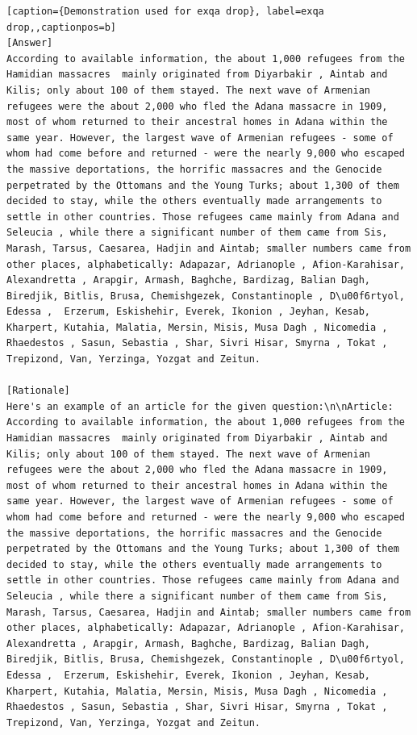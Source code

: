 \begin{lstlisting}[caption={Demonstration used for exqa drop}, label=exqa drop,,captionpos=b]
[Answer]
According to available information, the about 1,000 refugees from the Hamidian massacres  mainly originated from Diyarbakir , Aintab and Kilis; only about 100 of them stayed. The next wave of Armenian refugees were the about 2,000 who fled the Adana massacre in 1909, most of whom returned to their ancestral homes in Adana within the same year. However, the largest wave of Armenian refugees - some of whom had come before and returned - were the nearly 9,000 who escaped the massive deportations, the horrific massacres and the Genocide perpetrated by the Ottomans and the Young Turks; about 1,300 of them decided to stay, while the others eventually made arrangements to settle in other countries. Those refugees came mainly from Adana and Seleucia , while there a significant number of them came from Sis, Marash, Tarsus, Caesarea, Hadjin and Aintab; smaller numbers came from other places, alphabetically: Adapazar, Adrianople , Afion-Karahisar, Alexandretta , Arapgir, Armash, Baghche, Bardizag, Balian Dagh, Biredjik, Bitlis, Brusa, Chemishgezek, Constantinople , D\u00f6rtyol, Edessa ,  Erzerum, Eskishehir, Everek, Ikonion , Jeyhan, Kesab, Kharpert, Kutahia, Malatia, Mersin, Misis, Musa Dagh , Nicomedia , Rhaedestos , Sasun, Sebastia , Shar, Sivri Hisar, Smyrna , Tokat , Trepizond, Van, Yerzinga, Yozgat and Zeitun.

[Rationale]
Here's an example of an article for the given question:\n\nArticle: According to available information, the about 1,000 refugees from the Hamidian massacres  mainly originated from Diyarbakir , Aintab and Kilis; only about 100 of them stayed. The next wave of Armenian refugees were the about 2,000 who fled the Adana massacre in 1909, most of whom returned to their ancestral homes in Adana within the same year. However, the largest wave of Armenian refugees - some of whom had come before and returned - were the nearly 9,000 who escaped the massive deportations, the horrific massacres and the Genocide perpetrated by the Ottomans and the Young Turks; about 1,300 of them decided to stay, while the others eventually made arrangements to settle in other countries. Those refugees came mainly from Adana and Seleucia , while there a significant number of them came from Sis, Marash, Tarsus, Caesarea, Hadjin and Aintab; smaller numbers came from other places, alphabetically: Adapazar, Adrianople , Afion-Karahisar, Alexandretta , Arapgir, Armash, Baghche, Bardizag, Balian Dagh, Biredjik, Bitlis, Brusa, Chemishgezek, Constantinople , D\u00f6rtyol, Edessa ,  Erzerum, Eskishehir, Everek, Ikonion , Jeyhan, Kesab, Kharpert, Kutahia, Malatia, Mersin, Misis, Musa Dagh , Nicomedia , Rhaedestos , Sasun, Sebastia , Shar, Sivri Hisar, Smyrna , Tokat , Trepizond, Van, Yerzinga, Yozgat and Zeitun.




\end{lstlisting}
